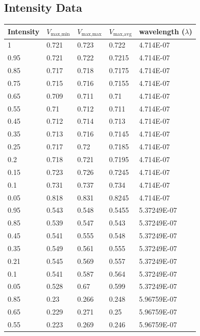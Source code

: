 \documentclass[12pt,a4paper]{article}
\begin{document}
\subsection{Intensity Data}
\begin{table}[H]
    \centering
    \begin{tabular}{lllll}
    \hline
        Intensity & $V_\text{max,min}$ & $V_\text{max,max}$ & $ V_\text{max,avg}$ & wavelength ($\lambda$) \\ \hline
        1 & 0.721 & 0.723 & 0.722 & 4.714E-07 \\ 
        0.95 & 0.721 & 0.722 & 0.7215 & 4.714E-07 \\ 
        0.85 & 0.717 & 0.718 & 0.7175 & 4.714E-07 \\ 
        0.75 & 0.715 & 0.716 & 0.7155 & 4.714E-07 \\ 
        0.65 & 0.709 & 0.711 & 0.71 & 4.714E-07 \\ 
        0.55 & 0.71 & 0.712 & 0.711 & 4.714E-07 \\ 
        0.45 & 0.712 & 0.714 & 0.713 & 4.714E-07 \\ 
        0.35 & 0.713 & 0.716 & 0.7145 & 4.714E-07 \\ 
        0.25 & 0.717 & 0.72 & 0.7185 & 4.714E-07 \\ 
        0.2 & 0.718 & 0.721 & 0.7195 & 4.714E-07 \\ 
        0.15 & 0.723 & 0.726 & 0.7245 & 4.714E-07 \\ 
        0.1 & 0.731 & 0.737 & 0.734 & 4.714E-07 \\ 
        0.05 & 0.818 & 0.831 & 0.8245 & 4.714E-07 \\ \hline
        0.95 & 0.543 & 0.548 & 0.5455 & 5.37249E-07 \\ 
        0.85 & 0.539 & 0.547 & 0.543 & 5.37249E-07 \\ 
        0.45 & 0.541 & 0.555 & 0.548 & 5.37249E-07 \\ 
        0.35 & 0.549 & 0.561 & 0.555 & 5.37249E-07 \\ 
        0.21 & 0.545 & 0.569 & 0.557 & 5.37249E-07 \\ 
        0.1 & 0.541 & 0.587 & 0.564 & 5.37249E-07 \\ 
        0.05 & 0.528 & 0.67 & 0.599 & 5.37249E-07 \\ \hline
        0.85 & 0.23 & 0.266 & 0.248 & 5.96759E-07 \\ 
        0.65 & 0.229 & 0.271 & 0.25 & 5.96759E-07 \\ 
        0.55 & 0.223 & 0.269 & 0.246 & 5.96759E-07 \\ 

\end{tabular}
\end{table}
\end{document}
